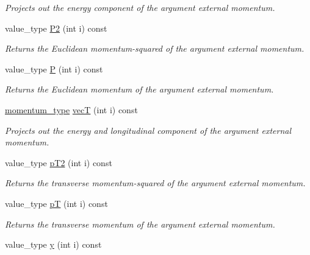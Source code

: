 \begin{DoxyCompactItemize}
\begin{DoxyCompactList}\small\item\em Projects out the energy component of the argument external momentum. \end{DoxyCompactList}\item 
\hypertarget{a00442_a98c2381b3d5e714373d0351d2a20203d}{value\-\_\-type \hyperlink{a00442_a98c2381b3d5e714373d0351d2a20203d}{P2} (int i) const }\label{a00442_a98c2381b3d5e714373d0351d2a20203d}

\begin{DoxyCompactList}\small\item\em Returns the Euclidean momentum-\/squared of the argument external momentum. \end{DoxyCompactList}\item 
\hypertarget{a00442_aa564f96d3a4e3caf1fb7cd52dc69de76}{value\-\_\-type \hyperlink{a00442_aa564f96d3a4e3caf1fb7cd52dc69de76}{P} (int i) const }\label{a00442_aa564f96d3a4e3caf1fb7cd52dc69de76}

\begin{DoxyCompactList}\small\item\em Returns the Euclidean momentum of the argument external momentum. \end{DoxyCompactList}\item 
\hyperlink{a00559}{momentum\-\_\-type} \hyperlink{a00442_a5d27a3b959353ca069e52ce563c69a6d}{vec\-T} (int i) const 
\begin{DoxyCompactList}\small\item\em Projects out the energy and longitudinal component of the argument external momentum. \end{DoxyCompactList}\item 
\hypertarget{a00442_ab9507bc3b8b353cad07df062dfe6b22c}{value\-\_\-type \hyperlink{a00442_ab9507bc3b8b353cad07df062dfe6b22c}{p\-T2} (int i) const }\label{a00442_ab9507bc3b8b353cad07df062dfe6b22c}

\begin{DoxyCompactList}\small\item\em Returns the transverse momentum-\/squared of the argument external momentum. \end{DoxyCompactList}\item 
\hypertarget{a00442_a6d4b77604cf7320e00d0ca61e720990f}{value\-\_\-type \hyperlink{a00442_a6d4b77604cf7320e00d0ca61e720990f}{p\-T} (int i) const }\label{a00442_a6d4b77604cf7320e00d0ca61e720990f}

\begin{DoxyCompactList}\small\item\em Returns the transverse momentum of the argument external momentum. \end{DoxyCompactList}\item 
\hypertarget{a00442_a0a1cc692e9579aeee74eebc0fcd4eb6e}{value\-\_\-type \hyperlink{a00442_a0a1cc692e9579aeee74eebc0fcd4eb6e}{y} (int i) const }\label{a00442_a0a1cc692e9579aeee74eebc0fcd4eb6e}


\end{DoxyCompactItemize}

